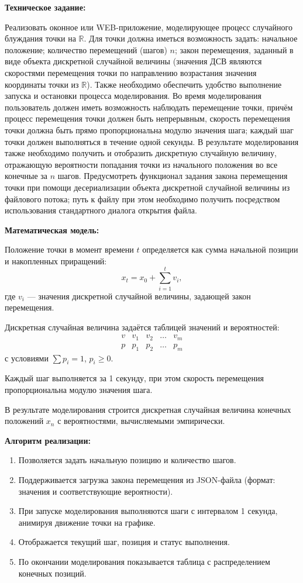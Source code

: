 \documentclass[a4paper]{article}
\theoremstyle{definition}
\begin{document}
\textbf{Техническое задание:}

Реализовать оконное или WEB-приложение, моделирующее процесс случайного блуждания точки на $\mathbb{R}$. Для точки должна иметься возможность задать: начальное положение; количество перемещений (шагов) $n$; закон перемещения, заданный в виде объекта дискретной случайной величины (значения ДСВ являются скоростями перемещения точки по направлению возрастания значения координаты точки из $\mathbb{R}$). Также необходимо обеспечить удобство выполнение запуска и остановки процесса моделирования. Во время моделирования пользователь должен иметь возможность наблюдать перемещение точки, причём процесс перемещения точки должен быть непрерывным, скорость перемещения точки должна быть прямо пропорциональна модулю значения шага; каждый шаг точки должен выполняться в течение одной секунды. В результате моделирования также необходимо получить и отобразить дискретную случайную величину, отражающую вероятности попадания точки из начального положения во все конечные за $n$ шагов. Предусмотреть функционал задания закона перемещения точки при помощи десериализации объекта дискретной случайной величины из файлового потока; путь к файлу при этом необходимо получить посредством использования стандартного диалога открытия файла.

\textbf{Математическая модель:}

Положение точки в момент времени $t$ определяется как сумма начальной позиции и накопленных приращений:
\begin{equation}
    x_t = x_0 + \sum_{i=1}^{t} v_i, \tag{12.1}
\end{equation}
где $v_i$ — значения дискретной случайной величины, задающей закон перемещения.

Дискретная случайная величина задаётся таблицей значений и вероятностей:
\[
\begin{array}{c|cccc}
v & v_1 & v_2 & \dots & v_m \\
\hline
p & p_1 & p_2 & \dots & p_m
\end{array}
\]
с условиями $\sum p_i = 1$, $p_i \ge 0$.

Каждый шаг выполняется за 1 секунду, при этом скорость перемещения пропорциональна модулю значения шага.

В результате моделирования строится дискретная случайная величина конечных положений $x_n$ с вероятностями, вычисляемыми эмпирически.

\textbf{Алгоритм реализации:}

\begin{enumerate}
    \item Позволяется задать начальную позицию и количество шагов.
    \item Поддерживается загрузка закона перемещения из JSON-файла (формат: значения и соответствующие вероятности).
    \item При запуске моделирования выполняются шаги с интервалом 1 секунда, анимируя движение точки на графике.
    \item Отображается текущий шаг, позиция и статус выполнения.
    \item По окончании моделирования показывается таблица с распределением конечных позиций.
\end{enumerate}
\end{document}
